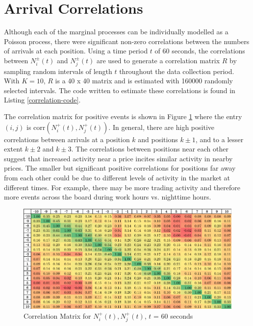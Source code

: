 \section{Arrival Correlations}\label{ch:correlations}
Although each of the marginal processes can be individually modelled as a Poisson process, there were significant non-zero correlations between the numbers of arrivals at each position. Using a time period $t$ of 60 seconds, the correlations between $N^{\pm}_i(t)$ and $N^{\pm}_j(t)$ are used to generate a correlation matrix $R$ by sampling random intervals of length $t$ throughout the data collection period. With $K=10$, $R$ is a 40 x 40 matrix and is estimated with 160000 randomly selected intervals. The code written to estimate these correlations is found in Listing \ref{correlation-code}.

The correlation matrix for positive events is shown in Figure \ref{fig:pos_pos_corr_pic} where the entry $(i,j)$ is $\text{corr}(N^{+}_i(t), N^{+}_j(t))$. In general, there are high positive correlations between arrivals at a position $k$ and positions $k \pm 1$, and to a lesser extent $k \pm 2$ and $k \pm 3$. The correlations between positions near each other suggest that increased activity near a price incites similar activity in nearby prices. The smaller but significant positive correlations for positions far away from each other could be due to different levels of activity in the market at different times. For example, there may be more trading activity and therefore more events across the board during work hours vs. nighttime hours.

\begin{figure}[t]
\begin{center}
\caption{Correlation Matrix for $N^{+}_i(t), N^{+}_j(t)$, $t$ = 60 seconds}
\label{fig:pos_pos_corr_pic}
\includegraphics[width=\textwidth]{LaTeX/Figures/pos_pos_correlations.png}
\end{center}
\end{figure}

